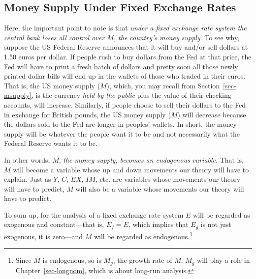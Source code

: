 \documentclass[
  letterpaper,
]{book}
\theoremstyle{plain}
\theoremstyle{remark}
\begin{document}
\subsection{Money Supply Under Fixed Exchange
Rates}\label{sec-fixexrates-money}

Here, the important point to note is that \emph{under a fixed exchange
rate system the central bank loses all control over \(M\), the country's
money supply}. To see why,
suppose the US Federal Reserve announces that it will buy and/or sell
dollars at 1.50 euros per dollar. If people rush to buy dollars from the
Fed at that price, the Fed will have to print a fresh batch of dollars
and pretty soon all those newly printed dollar bills will end up in the
wallets of those who traded in their euros. That is, the US money supply
(\(M\)), which, you may recall from Section~\ref{sec-msupply}, is the
currency \emph{held by the public} plus the value of their checking
accounts, will increase. Similarly, if people choose to sell their
dollars to the Fed in exchange for British pounds, the US money supply
(\(M\)) will decrease because the dollars sold to the Fed are longer in
peoples' wallets. In short, the money supply will be whatever the people
want it to be and not necessarily what the Federal Reserve wants it to
be.

In other words, \(M\), \emph{the money supply, becomes an endogenous
variable}. That is, \(M\) will become a variable whose up and down
movements our theory will have to explain. Just as \(Y\), \(C\), \(EX\),
\(IM\), etc. are variables whose movements our theory will have to
predict, \(M\) will also be a variable whose movements our theory will
have to predict.

To sum up, for the analysis of a fixed exchange rate system \(E\) will
be regarded as exogenous and constant---that is, \(E_f=E\), which
implies that \(E_g\) is not just exogenous, it is zero---and \(M\) will
be regarded as endogenous.\footnote{Since \(M\) is endogenous, so is
  \(M_g\), the growth rate of \(M\). \(M_g\) will play a role in
  Chapter~\ref{sec-longnom}, which is about long-run analysis.}
\end{document}

